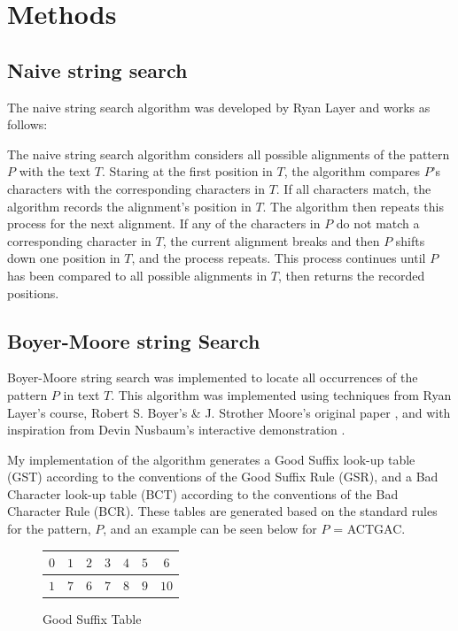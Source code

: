 \documentclass[11pt, letterpaper]{article}
\begin{document}
\section{Methods}

\subsection{Naive string search}
The naive string search algorithm was developed by Ryan Layer and works as follows: 
\begin{displayquote}
   The naive string search algorithm considers all possible alignments of the
pattern $P$ with the text $T$. Staring at the first position in $T$, the
algorithm compares $P$'s characters with the corresponding characters in $T$.
If all characters match, the algorithm records the alignment's position in $T$.
The algorithm then repeats this process for the next alignment. If any of the 
characters in $P$ do not match a corresponding character in $T$, the current
alignment breaks and then $P$ shifts down one position in $T$, and the process
repeats. This process continues until $P$ has been compared to all possible
alignments in $T$, then returns the recorded positions. 
\end{displayquote}

\subsection{Boyer-Moore string Search}

Boyer-Moore string search was implemented to locate all occurrences of the pattern $P$ in text $T$. This algorithm was implemented using techniques from Ryan Layer's course, Robert S. Boyer's \& J. Strother Moore's original paper \cite{10.1145/359842.359859}, and with inspiration from Devin Nusbaum's interactive demonstration \cite{Nusbaum}. 

My implementation of the algorithm generates a Good Suffix look-up table (GST) according to the conventions of the Good Suffix Rule (GSR), and a Bad Character look-up table (BCT) according to the conventions of the Bad Character Rule (BCR). These tables are generated based on the standard rules for the pattern, $P$, and an example can be seen below for $P$ = ACTGAC.

\begin{figure}[ht]
    \centering
    \begin{tabular}{ |c|c|c|c|c|c|c| } 
         \hline
         $0$ & $1$ & $2$ & $3$ & $4$ & $5$ & $6$\\
         \hline
         $1$ & $7$ & $6$ &$7$ & $8$ & $9$ & $10$\\
         \hline
    \end{tabular}
    \caption{Good Suffix Table}
    \label{fig:GST}
\end{figure}
\end{document}
